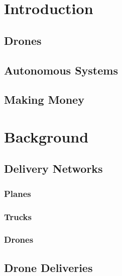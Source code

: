 \documentclass[12pt,titlepage]{article}
\begin{document}
%

\newpage

\tableofcontents

\newpage

\section{Introduction}
\subsection{Drones}
\subsection{Autonomous Systems}
\subsection{Making Money}


\newpage
\section{Background}

\subsection{Delivery Networks}
\subsubsection{Planes}
\subsubsection{Trucks}
\subsubsection{Drones}

\subsection{Drone Deliveries}
\end{document}
